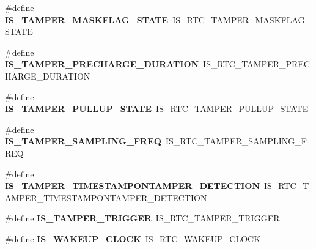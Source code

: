 \begin{DoxyCompactItemize}
\#define {\bfseries I\+S\+\_\+\+T\+A\+M\+P\+E\+R\+\_\+\+M\+A\+S\+K\+F\+L\+A\+G\+\_\+\+S\+T\+A\+TE}~I\+S\+\_\+\+R\+T\+C\+\_\+\+T\+A\+M\+P\+E\+R\+\_\+\+M\+A\+S\+K\+F\+L\+A\+G\+\_\+\+S\+T\+A\+TE
\item 
\mbox{\label{group___h_a_l___r_t_c___aliased___macros_gacaaf7b6159a85289691dea9b0d3a6195}} 
\#define {\bfseries I\+S\+\_\+\+T\+A\+M\+P\+E\+R\+\_\+\+P\+R\+E\+C\+H\+A\+R\+G\+E\+\_\+\+D\+U\+R\+A\+T\+I\+ON}~I\+S\+\_\+\+R\+T\+C\+\_\+\+T\+A\+M\+P\+E\+R\+\_\+\+P\+R\+E\+C\+H\+A\+R\+G\+E\+\_\+\+D\+U\+R\+A\+T\+I\+ON
\item 
\mbox{\label{group___h_a_l___r_t_c___aliased___macros_gaf061929111a6987f8a74e09e239d686b}} 
\#define {\bfseries I\+S\+\_\+\+T\+A\+M\+P\+E\+R\+\_\+\+P\+U\+L\+L\+U\+P\+\_\+\+S\+T\+A\+TE}~I\+S\+\_\+\+R\+T\+C\+\_\+\+T\+A\+M\+P\+E\+R\+\_\+\+P\+U\+L\+L\+U\+P\+\_\+\+S\+T\+A\+TE
\item 
\mbox{\label{group___h_a_l___r_t_c___aliased___macros_ga534eeb558f5ddd78594acc82dbc56b9d}} 
\#define {\bfseries I\+S\+\_\+\+T\+A\+M\+P\+E\+R\+\_\+\+S\+A\+M\+P\+L\+I\+N\+G\+\_\+\+F\+R\+EQ}~I\+S\+\_\+\+R\+T\+C\+\_\+\+T\+A\+M\+P\+E\+R\+\_\+\+S\+A\+M\+P\+L\+I\+N\+G\+\_\+\+F\+R\+EQ
\item 
\mbox{\label{group___h_a_l___r_t_c___aliased___macros_ga7da808c5448f1ebf7f29c44dee830446}} 
\#define {\bfseries I\+S\+\_\+\+T\+A\+M\+P\+E\+R\+\_\+\+T\+I\+M\+E\+S\+T\+A\+M\+P\+O\+N\+T\+A\+M\+P\+E\+R\+\_\+\+D\+E\+T\+E\+C\+T\+I\+ON}~I\+S\+\_\+\+R\+T\+C\+\_\+\+T\+A\+M\+P\+E\+R\+\_\+\+T\+I\+M\+E\+S\+T\+A\+M\+P\+O\+N\+T\+A\+M\+P\+E\+R\+\_\+\+D\+E\+T\+E\+C\+T\+I\+ON
\item 
\mbox{\label{group___h_a_l___r_t_c___aliased___macros_gaa0fe0373701cfd583ae46173a60248b2}} 
\#define {\bfseries I\+S\+\_\+\+T\+A\+M\+P\+E\+R\+\_\+\+T\+R\+I\+G\+G\+ER}~I\+S\+\_\+\+R\+T\+C\+\_\+\+T\+A\+M\+P\+E\+R\+\_\+\+T\+R\+I\+G\+G\+ER
\item 
\mbox{\label{group___h_a_l___r_t_c___aliased___macros_ga85becc3221346e2b872ca8f205776a47}} 
\#define {\bfseries I\+S\+\_\+\+W\+A\+K\+E\+U\+P\+\_\+\+C\+L\+O\+CK}~I\+S\+\_\+\+R\+T\+C\+\_\+\+W\+A\+K\+E\+U\+P\+\_\+\+C\+L\+O\+CK

\end{DoxyCompactItemize}
